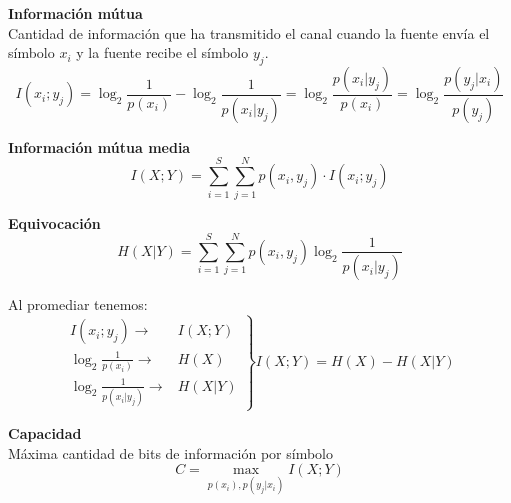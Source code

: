 \documentclass[10pt,a4paper]{article}
\begin{document}
\begin{tcolorbox}[title=Canal discreto]
    \textbf{Información mútua} \\
    Cantidad de información que ha transmitido el canal cuando la fuente envía el símbolo $x_i$ y la fuente recibe el símbolo $y_j$.
    \[
        I(x_i;y_j) = \log_2{\frac{1}{p(x_i)}} - \log_2{\frac{1}{p(x_i \vert y_j)}} = \log_2{\frac{p(x_i \vert y_j)}{p(x_i)}} = \log_2{\frac{p(y_j \vert x_i)}{p(y_j)}}
    \]

    \textbf{Información mútua media} \\
    \[
        I(X;Y) = \sum_{i=1}^{S}\sum_{j=1}^{N}{p(x_i,y_j) \cdot I(x_i;y_j)}
    \]

    \textbf{Equivocación} \\
    \[
        H(X \vert Y) = \sum\limits_{i=1}^{S}\sum\limits_{j=1}^{N}{p(x_i,y_j)\log_2{\frac{1}{p(x_i \vert y_j)}}}
    \]

    Al promediar tenemos:
    \[
        \left.
        \begin{array}{rl}
            I(x_i;y_j) \to & I(X;Y) \\
            \log_2{\frac{1}{p(x_i)}} \to & H(X) \\
            \log_2{\frac{1}{p(x_i \vert y_j)}} \to & H(X \vert Y)
        \end{array}
        \right\}
        I(X;Y) = H(X) - H(X \vert Y)
    \]

    \textbf{Capacidad} \\
    Máxima cantidad de bits de información por símbolo
    \[
        C = \max\limits_{p(x_i), p(y_j \vert x_i)}{I(X;Y)}
    \]
\end{tcolorbox}
\end{document}
